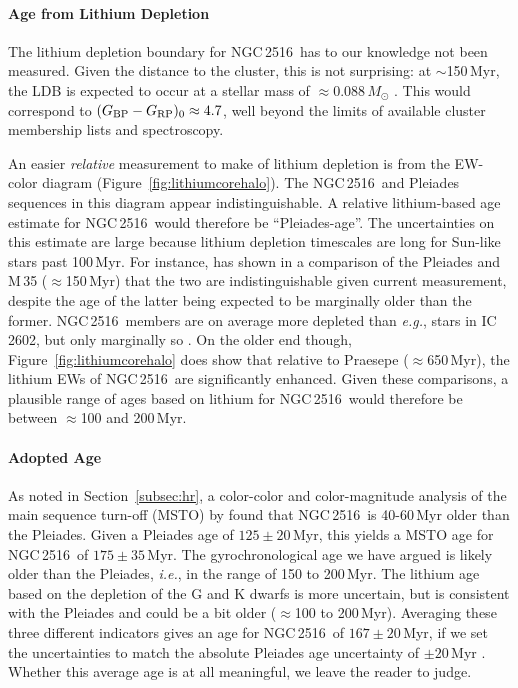 \documentclass[12pt,twocolumn,tighten]{aastex63}
\newcommand{\cn}{NGC\,2516} %
\newcommand{\bpmrpo}{(G_{\rm BP}-G_{\rm RP})_0}
\begin{document}
\paragraph{Age from Lithium Depletion}
The lithium depletion boundary for \cn\ has to our knowledge not been
measured.  Given the distance to the cluster, this is not surprising:
at $\sim$150\,Myr, the LDB is expected to occur at a stellar mass of
$\approx$0.088\,$M_\odot$ \citep{soderblom_ages_2014}.  This would
correspond to $\bpmrpo\approx4.7$, well beyond the limits of available
cluster membership lists and spectroscopy.

An easier {\it relative} measurement to make of lithium depletion is
from the EW-color diagram (Figure~\ref{fig:lithiumcorehalo}).  The
\cn\ and Pleiades sequences in this diagram appear indistinguishable.
A relative lithium-based age estimate for \cn\ would therefore be
``Pleiades-age''.  The uncertainties on this estimate are large
because lithium depletion timescales are long for Sun-like stars past
100\,Myr.  For instance, \citet{jeffries_m35_li_2020} has shown in a
comparison of the Pleiades and M\,35 ($\approx$150\,Myr) that the two
are indistinguishable given current measurement, despite the age of
the latter being expected to be marginally older than the former.
\cn\ members are on average more depleted than {\it e.g.}, stars in
IC\,2602, but only marginally so \citep{soderblom_ages_2014}.  On the
older end though, Figure~\ref{fig:lithiumcorehalo} does show that
relative to Praesepe ($\approx$650\,Myr), the lithium EWs of \cn\ are
significantly enhanced.  Given these comparisons, a plausible range of
ages based on lithium for \cn\ would therefore be between $\approx$100
and 200\,Myr.

\paragraph{Adopted Age}
As noted in Section~\ref{subsec:hr}, a color-color and color-magnitude analysis of the
main sequence turn-off (MSTO) by \citet{cummings_2018} found that \cn\
is 40-60\,Myr older than the Pleiades.  Given a Pleiades age of
$125\pm20$\,Myr, this yields a MSTO age for \cn\ of $175\pm35$\,Myr.
The gyrochronological age we have argued is likely older than the
Pleiades, {\it i.e.}, in the range of 150 to 200\,Myr.  The lithium
age based on the depletion of the G and K dwarfs is more uncertain,
but is consistent with the Pleiades and could be a bit older
($\approx$100 to 200\,Myr).  Averaging these three different
indicators gives an age for \cn\ of $167\pm20$\,Myr, if we set the
uncertainties to match the absolute Pleiades age uncertainty of $\pm
20\,$Myr \citep{soderblom_ages_2014}.  Whether this average age is at
all meaningful, we leave the reader to judge.
\end{document}
